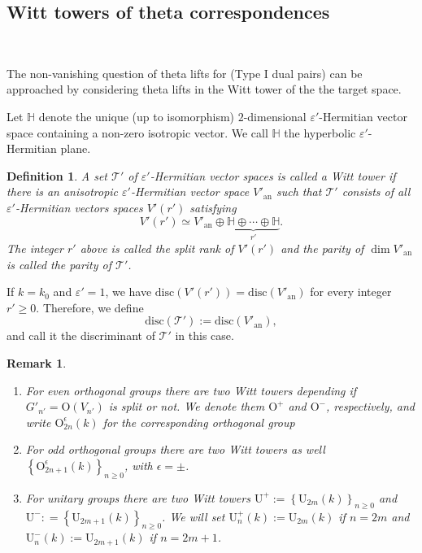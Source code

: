 \documentclass[12pt]{amsart}
\numberwithin{equation}{subsection}
\newtheorem{defn}[equation]{Definition}
\newtheorem{remark}[equation]{Remark}
\newcommand{\cT}{\mathcal{T}}
\newcommand{\rU}{\mathrm{U}}
\newcommand{\an}{\operatorname{an}}
\newcommand{\disc}{\operatorname{disc}}
\newcommand{\bbH}{\mathbb{H}}
\def\disc{{\mathrm{disc}}}
\def\rO{{\mathrm{O}}}
\def\an{{\mathrm{an}}}
\def\cT{{\mathcal{T}}}
\def\disc{{\mathrm{disc}}}
\begin{document}
\subsection{Witt towers of theta correspondences}\

The non-vanishing question of theta lifts for (Type I dual pairs) can be approached by considering theta lifts in the Witt tower of the the target space.

Let $\bbH$ denote the unique (up to isomorphism) $2$-dimensional $\varepsilon'$-Hermitian vector space containing a non-zero isotropic vector. We call $\bbH$  the hyperbolic $\varepsilon'$-Hermitian plane.

\begin{defn} {\rm 
 A set $\cT'$ of $\varepsilon'$-Hermitian vector spaces is called a \textit{Witt tower} if there is an anisotropic  $\varepsilon'$-Hermitian vector  space $V'_\an$  such that $\cT'$ consists of all $\varepsilon'$-Hermitian vectors spaces $V'(r')$
 satisfying
\[V'(r')\simeq V'_\an\oplus \underbrace{\bbH\oplus\cdots\oplus\bbH}_{r'}.\] 
The integer $r'$ above is called the \textit{split rank} of  $V'(r')$ and the parity of $\dim V'_\an$ is called the \textit{parity of $\cT'$}.
}
\end{defn}
If $k=k_0$ and $\varepsilon'=1$, we have $\disc(V'(r'))=\disc( V'_\an)$ for every integer $r'\ge 0$.
Therefore, we define 
\begin{equation}
\disc(\cT'):= \disc( V'_\an),
\end{equation} and call it the discriminant of $\cT'$ in this case.
\begin{remark} \

{\rm
\begin{enumerate}
\item For even orthogonal groups there are two Witt towers depending if $G'_{n'}=\rO(V_{n'})$ is split or not. We denote them $\rO^+$ and $\rO^-$, respectively, and write $\rO_{2n}^\epsilon(k)$ for the corresponding orthogonal group
\item
For odd orthogonal groups there are two Witt towers as well $\left\{\rO_{2n+1}^\epsilon(k)\right\}_{n\ge 0}$, with $\epsilon=\pm$.
\item
For unitary groups there are two Witt towers $\rU^+:= \left\{\rU_{2m}(k)\right\}_{n\ge 0}$ 
and $\rU^-: = \left\{\rU_{2m+1}(k)\right\}_{n\ge 0}$. We will set $\rU^+_n(k):=\rU_{2m}(k)$ if $n=2m$ and  $\rU^-_n(k):=\rU_{2m+1}(k)$ if $n=2m+1$.
\end{enumerate}}
\end{remark}
\end{document}
